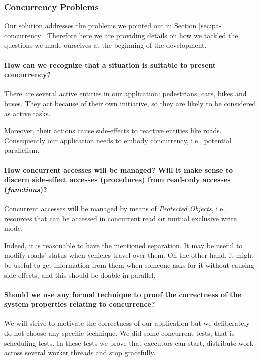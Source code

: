 
\subsubsection{Concurrency Problems}
\label{sec:sol-conc-problems}

Our solution addresses the problems we pointed out in Section
\ref{sec:pa-concurrency}.
Therefore here we are providing details on how we tackled the questions we
made ourselves at the beginning of the development.

\paragraph{How can we recognize that a situation is suitable to present
concurrency?}
There are several active entities in our application: pedestrians, cars, bikes
and buses. They act because of their own initiative, so they are likely to be
considered as active tasks.

Moreover, their actions cause side-effects to reactive entities like roads.
Consequently our application needs to embody concurrency, i.e., potential
parallelism.

\paragraph{How concurrent accesses will be managed? Will it make sense to
discern side-effect accesses (procedures) from read-only accesses
(\textit{functions})?}
Concurrent accesses will be managed by means of \textit{Protected Objects},
i.e., resources that can be accessed in concurrent read \textbf{or} mutual
exclusive write mode.

Indeed, it is reasonable to have the mentioned separation.
It may be useful to modify roads' status when vehicles travel over them.
On the other hand, it might be useful to get information from them when
someone asks for it without causing side-effects, and this should be
doable in
parallel.

\paragraph{Should we use any formal technique to proof the correctness
of the system properties relating to concurrence?}
We will strive to motivate the correctness of our application but we
deliberately do not choose any specific technique.
We did some concurrent tests, that is scheduling tests. In these tests we prove
that executors can start, distribute work across several worker threads and
stop gracefully.

